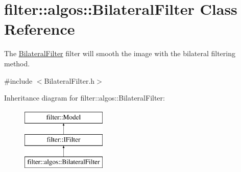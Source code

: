 \hypertarget{classfilter_1_1algos_1_1_bilateral_filter}{}\section{filter\+:\+:algos\+:\+:Bilateral\+Filter Class Reference}
\label{classfilter_1_1algos_1_1_bilateral_filter}


The \hyperlink{classfilter_1_1algos_1_1_bilateral_filter}{Bilateral\+Filter} filter will smooth the image with the bilateral filtering method.  




{\ttfamily \#include $<$Bilateral\+Filter.\+h$>$}

Inheritance diagram for filter\+:\+:algos\+:\+:Bilateral\+Filter\+:\begin{figure}[H]
\begin{center}
\leavevmode
\includegraphics[height=3.000000cm]{d3/dc4/classfilter_1_1algos_1_1_bilateral_filter}
\end{center}
\end{figure}
